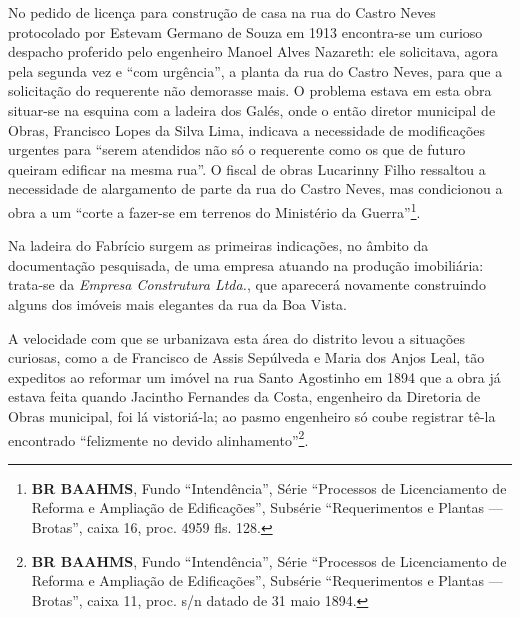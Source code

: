 No pedido de licença para construção de casa na rua do Castro Neves protocolado por Estevam Germano de Souza em 1913 encontra-se um curioso despacho proferido pelo engenheiro Manoel Alves Nazareth: ele solicitava, agora pela segunda vez e ``com urgência'', a planta da rua do Castro Neves, para que a solicitação do requerente não demorasse mais. O problema estava em esta obra situar-se na esquina com a ladeira dos Galés, onde o então diretor municipal de Obras, Francisco Lopes da Silva Lima, indicava a necessidade de modificações urgentes para ``serem atendidos não só o requerente como os que de futuro queiram edificar na mesma rua''. O fiscal de obras Lucarinny Filho ressaltou a necessidade de alargamento de parte da rua do Castro Neves, mas condicionou a obra a um ``corte a fazer-se em terrenos do Ministério da Guerra''\footnote{\textbf{BR BAAHMS}, Fundo ``Intendência'', Série ``Processos de Licenciamento de Reforma e Ampliação de Edificações'', Subsérie ``Requerimentos e Plantas --- Brotas'', caixa 16, proc. 4959 fls. 128.}.


Na ladeira do Fabrício surgem as primeiras indicações, no âmbito da documentação pesquisada, de uma empresa atuando na produção imobiliária: trata-se da \textit{Empresa Construtura Ltda.}, que aparecerá novamente construindo alguns dos imóveis mais elegantes da rua da Boa Vista.

A velocidade com que se urbanizava esta área do distrito levou a situações curiosas, como a de Francisco de Assis Sepúlveda e Maria dos Anjos Leal, tão expeditos ao reformar um imóvel na rua Santo Agostinho em 1894 que a obra já estava feita quando Jacintho Fernandes da Costa, engenheiro da Diretoria de Obras municipal, foi lá vistoriá-la; ao pasmo engenheiro só coube registrar tê-la encontrado ``felizmente no devido alinhamento''\footnote{\textbf{BR BAAHMS}, Fundo ``Intendência'', Série ``Processos de Licenciamento de Reforma e Ampliação de Edificações'', Subsérie ``Requerimentos e Plantas --- Brotas'', caixa 11, proc. s/n datado de 31 maio 1894.}.

